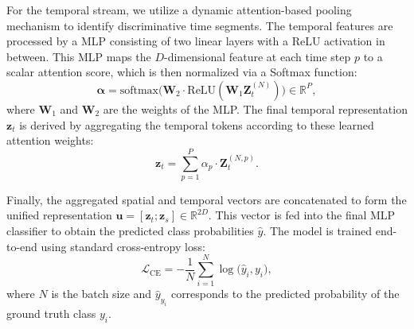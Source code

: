 \documentclass[journal]{IEEEtran}
\theoremstyle{plain}
\begin{document}
For the temporal stream, we utilize a dynamic attention-based pooling mechanism to identify discriminative time segments. The temporal features are processed by a MLP consisting of two linear layers with a ReLU activation in between. This MLP maps the $D$-dimensional feature at each time step $p$ to a scalar attention score, which is then normalized via a Softmax function:
\begin{equation}
\boldsymbol{\alpha} = \text{softmax}\big(\mathbf{W}_2 \cdot \text{ReLU}(\mathbf{W}_1 \mathbf{Z}_t^{(N)})\big) \in \mathbb{R}^P,
\label{eq:temporal_att_score}
\end{equation}
where $\mathbf{W}_1$ and $\mathbf{W}_2$ are the weights of the MLP. The final temporal representation $\mathbf{z}_{t}$ is derived by aggregating the temporal tokens according to these learned attention weights:
\begin{equation}
\mathbf{z}_{t} = \sum_{p=1}^{P} \alpha_p \cdot \mathbf{Z}_t^{(N, p)}.
\label{eq:temporal_fusion}
\end{equation}

Finally, the aggregated spatial and temporal vectors are concatenated to form the unified representation $\mathbf{u} = [\mathbf{z}_{t}; \mathbf{z}_{s}] \in \mathbb{R}^{2D}$. This vector is fed into the final MLP classifier to obtain the predicted class probabilities $\hat{y}$. The model is trained end-to-end using standard cross-entropy loss:
\begin{equation}
\mathcal{L}_{\text{CE}} = -\frac{1}{N}\sum_{i=1}^{N} \log\big(\hat{y}_{i},{y_i}\big),
\label{eq:loss}
\end{equation}
where $N$ is the batch size and $\hat{y}_{y_i}$ corresponds to the predicted probability of the ground truth class $y_i$.
\end{document}

